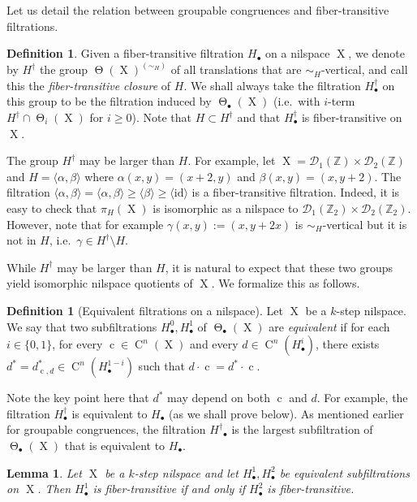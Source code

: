 \documentclass[a4paper,12pt,reqno]{amsart}
\newcommand*{\compl}[1]{#1^\dagger}
\newtheorem{lemma}[theorem]{Lemma}
\theoremstyle{definition}
\newtheorem{defn}[theorem]{Definition}
\newcommand{\mc}{\mathcal}
\newcommand{\mb}{\mathbb}
\newcommand{\id}{\mathrm{id}}
\DeclareMathOperator{\tran}{\Theta}
\DeclareMathOperator{\q}{c}
\DeclareMathOperator{\ns}{X}
\DeclareMathOperator{\cu}{C}
\begin{document}
\noindent Let us detail the relation between groupable congruences and fiber-transitive filtrations.
\begin{defn}\label{def:closure-of-fib-tran-group}
Given a fiber-transitive filtration $H_\bullet$ on a nilspace $\ns$, we denote by $\compl{H}$ the group $\tran(\ns)^{(\sim_H)}$ of all translations that are $\sim_H$-vertical, and call this the \emph{fiber-transitive closure} of $H$. We shall always take the filtration $\compl{H}_\bullet$ on this group to be the filtration induced by $\tran_\bullet(\ns)$ (i.e.\ with $i$-term ${\compl{H}}\cap \tran_i(\ns)$ for $i\ge 0$). Note that $H\subset {\compl{H}}$ and that $\compl{H}_\bullet$ is fiber-transitive on $\ns$.
\end{defn}
\noindent The group $\compl{H}$ may be larger than $H$. For example, let $\ns=\mc{D}_1(\mb{Z})\times \mc{D}_2(\mb{Z})$ and $H=\langle \alpha,\beta\rangle$ where $\alpha(x,y)=(x+2,y)$ and $\beta(x,y)=(x,y+2)$. The filtration $\langle \alpha,\beta\rangle= \langle \alpha,\beta\rangle \ge \langle \beta\rangle \ge \langle \id\rangle$ is a fiber-transitive filtration. Indeed, it is easy to check that $\pi_H(\ns)$ is isomorphic as a nilspace to $\mc{D}_1(\mb{Z}_2)\times \mc{D}_2(\mb{Z}_2)$. However, note that for example $\gamma(x,y):=(x,y+2x)$ is $\sim_H$-vertical but it is not in $H$, i.e.\ $\gamma\in \compl{H}\setminus H$.  

While ${\compl{H}}$ may be larger than $H$, it is natural to expect that these two groups yield isomorphic nilspace quotients of $\ns$. We formalize this as follows.
\begin{defn}[Equivalent filtrations on a nilspace]
Let $\ns$ be a $k$-step nilspace. We say that two subfiltrations $H^0_\bullet, H^1_\bullet$ of $\tran_\bullet(\ns)$ are \emph{equivalent} if for each $i\in\{0,1\}$, for every $\q\in \cu^n(\ns)$ and every $d\in \cu^n(H^i_\bullet)$, there exists $d^*=d^*_{\q,d}\in \cu^n(H^{1-i}_\bullet)$ such that $d\cdot \q = d^*\cdot \q$. 
\end{defn}
Note the key point here that $d^*$ may depend on both $\q$ and $d$.  For example, the filtration $\compl{H}_\bullet$ is equivalent to $H_\bullet$ (as we shall prove below). As mentioned earlier for groupable congruences, the filtration ${\compl{H}}_\bullet$ is the largest subfiltration of $\tran_\bullet(\ns)$ that is equivalent to $H_\bullet$.
\begin{lemma}\label{lem:ft-iff}
Let $\ns$ be a $k$-step nilspace and let $H^1_\bullet, H^2_\bullet$ be equivalent subfiltrations on $\ns$. Then $H^1_\bullet$ is fiber-transitive if and only if $H^2_\bullet$ is fiber-transitive.
\end{lemma}
\end{document}

